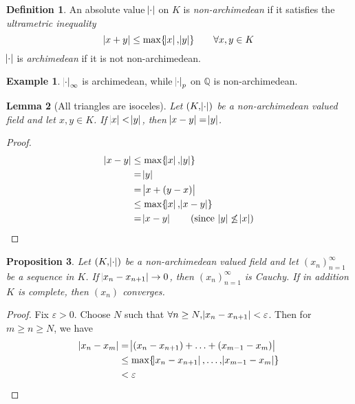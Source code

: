 \documentclass[11pt]{article}
\theoremstyle{definition}
\newtheorem{definition}{Definition}[subsection]
\newtheorem*{example}{Example}
\theoremstyle{plain}
\newtheorem{proposition}[definition]{Proposition}
\newtheorem{lemma}[definition]{Lemma}
\theoremstyle{remark}
\newcommand{\QQ}{\mathbb{Q}}
\begin{document}
\begin{definition}\label{def:1_4}
    An absolute value $\abs{\cdot}$ on $K$ is \emph{non-archimedean} if it satisfies the \emph{ultrametric inequality}
    \begin{equation*}
        \abs{x + y} \le \max\{\abs{x}, \abs{y}\} \qquad \forall x, y \in K
    \end{equation*}
    $\abs{\cdot}$ is \emph{archimedean} if it is not non-archimedean.
\end{definition}

\begin{example}
    $\abs{\cdot}_\infty$ is archimedean, while $\abs{\cdot}_p$ on $\QQ$ is non-archimedean.
\end{example}

\begin{lemma}[All triangles are isoceles]\label{lem:1_5}
    Let $(K, \abs{\cdot})$ be a non-archimedean valued field and let $x, y \in K$. If $\abs{x} < \abs{y}$, then $\abs{x - y} = \abs{y}$.
\end{lemma}
\begin{proof}
    \begin{align*}
        \abs{x - y}
        &\le \max\{\abs{x}, \abs{y}\}\\
        &= \abs{y}\\
        &= \abs{x + (y - x)}\\
        &\le \max\{\abs{x}, \abs{x - y}\} \\
        &= \abs{x - y} \qquad(\text{since } \abs{y} \not\le \abs{x}) \qedhere
    \end{align*}
\end{proof}

\begin{proposition}\label{prop:1_6}
    Let $(K, \abs{\cdot})$ be a non-archimedean valued field and let $(x_n)_{n=1}^\infty$ be a sequence in $K$. If $\abs{x_n - x_{n+1}} \to 0$, then $(x_n)_{n=1}^\infty$ is Cauchy. If in addition $K$ is complete, then $(x_n)$ converges.
\end{proposition}
\begin{proof}
    Fix $\varepsilon > 0$. Choose $N$ such that $\forall n \ge N, \abs{x_n - x_{n+1}} < \varepsilon$. Then for $m \ge n \ge N$, we have
    \begin{align*}
        \abs{x_n - x_m}
        &= \abs{(x_n - x_{n+1}) + \ldots + (x_{m-1} - x_m)}\\
        &\le \max\{\abs{x_n - x_{n+1}}, \ldots, \abs{x_{m-1} - x_m} \}\\
        &< \varepsilon \qedhere
    \end{align*}
\end{proof}
\end{document}
